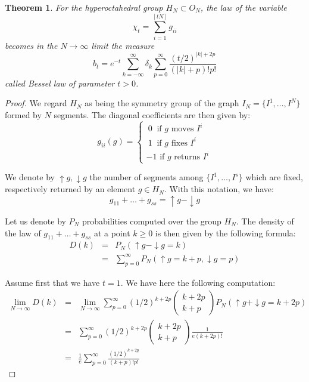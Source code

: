 \documentclass[12pt]{amsbook}
\newtheorem{theorem}{Theorem}[chapter]
\begin{document}
\begin{theorem}
For the hyperoctahedral group $H_N\subset O_N$, the law of the variable
$$\chi_t=\sum_{i=1}^{[tN]}g_{ii}$$
becomes in the $N\to\infty$ limit the measure
$$b_t=e^{-t}\sum_{k=-\infty}^\infty\delta_k\sum_{p=0}^\infty \frac{(t/2)^{|k|+2p}}{(|k|+p)!p!}$$ 
called Bessel law of parameter $t>0$.
\end{theorem}

\begin{proof}
We regard $H_N$ as being the symmetry group of the graph $I_N=\{I^1,\ldots ,I^N\}$ formed by $N$ segments. The diagonal coefficients are then given by:
$$g_{ii}(g)=\begin{cases}
\ 0\ \mbox{ if $g$ moves $I^i$}\\
\ 1\ \mbox{ if $g$ fixes $I^i$}\\
-1\mbox{ if $g$ returns $I^i$}
\end{cases}$$

We denote by $\uparrow g,\downarrow g$ the number of segments among $\{I^1,\ldots ,I^s\}$ which are fixed, respectively returned by an element $g\in H_N$. With this notation, we have:
$$g_{11}+\ldots+g_{ss}=\uparrow g-\downarrow g$$

Let us denote by $P_N$ probabilities computed over the group $H_N$. The density of the law of $g_{11}+\ldots+g_{ss}$ at a point $k\geq 0$ is then given by the following formula:
\begin{eqnarray*}
D(k)
&=&P_N(\uparrow g-\downarrow g=k)\\
&=&\sum_{p=0}^\infty P_N(\uparrow g=k+p, \downarrow g=p)
\end{eqnarray*}

Assume first that we have $t=1$. We have here the following computation:
\begin{eqnarray*}
\lim_{N\to\infty}D(k)
&=&\lim_{N\to\infty}\sum_{p=0}^\infty(1/2)^{k+2p}\begin{pmatrix}k+2p\\ k+p\end{pmatrix} P_N(\uparrow g+\downarrow g=k+2p)\\ 
&=&\sum_{p=0}^\infty(1/2)^{k+2p}\begin{pmatrix}k+2p\\
k+p\end{pmatrix}\frac{1}{e(k+2p)!}\\
&=&\frac{1}{e}\sum_{p=0}^\infty \frac{(1/2)^{k+2p}}{(k+p)!p!}
\end{eqnarray*}


\end{proof}
\end{document}
